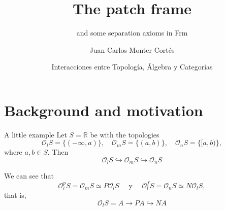 \documentclass[compress,12pt]{beamer}
\title{The patch frame}
\subtitle{and some separation axioms in Frm}
\date{Interacciones entre Topología, Álgebra y Categorías}
\author{Juan Carlos Monter Cortés}
\institute{Universidad de Guadalajara}
\begin{document}
\frame[plain]{\titlepage}

\section{Background and motivation}
\begin{frame}{A little example}
Let $S=\mathbb{R}$ be with the topologies
\[
\mathcal{O}_lS=\{(-\infty, a)\},\quad  \mathcal{O}_mS=\{(a,b)\}, \quad \mathcal{O}_nS=\{[a,b)\},
\]
where $a,b\in S$. Then
\[
\mathcal{O}_lS \hookrightarrow \mathcal{O}_mS \hookrightarrow \mathcal{O}_nS
\]

We can see that 
\[
\mathcal{O}_l^pS=\mathcal{O}_mS\simeq P\mathcal{O}_lS\quad\mbox{ y }\quad\mathcal{O}_l^fS=\mathcal{O}_nS\simeq N\mathcal{O}_lS,
\]
that is, 
\[
\mathcal{O}_lS=A\rightarrow PA\hookrightarrow NA
\]
\end{frame}
\end{document}

